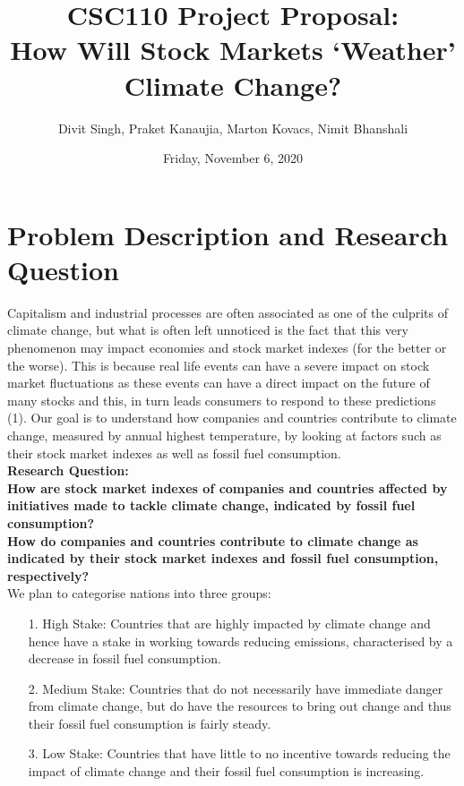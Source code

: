 \documentclass[fontsize=11pt]{article}
\title{CSC110 Project Proposal: \\
How Will Stock Markets ‘Weather’ Climate Change?}
\author{Divit Singh, Praket Kanaujia, Marton Kovacs,  Nimit Bhanshali}
\date{Friday, November 6, 2020}
\begin{document}
\maketitle

\section*{Problem Description and Research Question}
Capitalism and industrial processes are often associated as one of the
culprits of climate change, but what is often left unnoticed is the fact
that this very phenomenon may impact economies and stock market indexes
(for the better or the worse). This is because real life events can have
a severe impact on stock market fluctuations as these events can have a direct impact on the future of many stocks and this, in turn leads consumers to respond to these predictions (1). Our goal is to understand how companies and countries contribute to climate change, measured by annual highest temperature, by looking at factors such as their stock market indexes as well as fossil fuel consumption.\\

\noindent \textbf{Research Question:}\\

\textbf{How are stock market indexes of companies and countries affected by initiatives made to tackle climate change, indicated by fossil fuel consumption?}\\

\textbf{How do companies and countries contribute to climate change as indicated by their stock market indexes and fossil fuel consumption, respectively?}\\

\noindent We plan to categorise nations into three groups:\

\begin{enumerate}
    \item[1.] High Stake: Countries that are highly impacted by climate change and hence have a stake in working towards reducing emissions, characterised by a decrease in fossil fuel consumption.
    \item[2.] Medium Stake: Countries that do not necessarily have immediate danger from climate change, but do have the resources to bring out change and thus their fossil fuel consumption is fairly steady.
    \item[3.] Low Stake: Countries that have little to no incentive towards reducing the impact of climate change and their fossil fuel consumption is increasing.
\end{enumerate}
\end{document}
